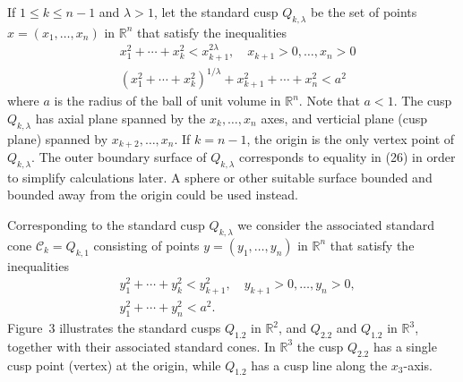 \begin{para}
  If $1 \leq k \leq n-1$ and $\lambda>1$, let the standard cusp $Q_{k, \lambda}$ be the set of points $x=\left(x_1, \ldots, x_n\right)$ in $\mathbb{R}^n$ that satisfy the inequalities
  \[
  \begin{aligned}
  & x_1^2+\cdots+x_k^2<x_{k+1}^{2 \lambda}, \quad x_{k+1}>0, \ldots, x_n>0 \\
  & \left(x_1^2+\cdots+x_k^2\right)^{1 / \lambda}+x_{k+1}^2+\cdots+x_n^2<a^2
  \end{aligned}
  \]
  where $a$ is the radius of the ball of unit volume in $\mathbb{R}^n$. Note that $a<1$.
  The cusp $Q_{k, \lambda}$ has axial plane spanned by the $x_k, \ldots, x_n$ axes, and verticial 
  plane (cusp plane) spanned by $x_{k+2}, \ldots, x_n$. If $k=n-1$, the origin is the only vertex 
  point of $Q_{k, \lambda}$. The outer boundary surface of $Q_{k, \lambda}$ corresponds to 
  equality in (26) in order to simplify calculations later. A sphere or other suitable surface 
  bounded and bounded away from the origin could be used instead.
  
  Corresponding to the standard cusp $Q_{k, \lambda}$ we consider the associated standard cone $\mathcal{C}_k=Q_{k, 1}$ consisting of points $y=\left(y_1, \ldots, y_n\right)$ in $\mathbb{R}^n$ that satisfy the inequalities
  \[
  \begin{aligned}
  & y_1^2+\cdots+y_k^2<y_{k+1}^2, \quad y_{k+1}>0, \ldots, y_n>0, \\
  & y_1^2+\cdots+y_n^2<a^2 .
  \end{aligned}
  \]
  Figure~3 illustrates the standard cusps $Q_{1.2}$ in $\mathbb{R}^2$, and $Q_{2.2}$
  and $Q_{1.2}$ in $\mathbb{R}^3$, together with their associated standard cones.
  In $\mathbb{R}^3$ the cusp $Q_{2.2}$ has a single cusp point (vertex) at the origin,
  while $Q_{1.2}$ has a cusp line along the $x_3$-axis.
  

\end{para}
